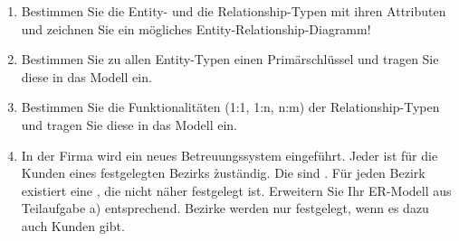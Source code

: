 \documentclass{lehramt-informatik-aufgabe}
\begin{document}
\begin{enumerate}


\item Bestimmen Sie die Entity- und die Relationship-Typen mit ihren
Attributen und zeichnen Sie ein mögliches Entity-Relationship-Diagramm!


\item Bestimmen Sie zu allen Entity-Typen einen Primärschlüssel und
tragen Sie diese in das Modell ein.


\item Bestimmen Sie die Funktionalitäten (1:1, 1:n, n:m) der
Relationship-Typen und tragen Sie diese in das Modell ein.


\item In der Firma wird ein neues Betreuungssystem eingeführt. Jeder
 ist für die Kunden eines festgelegten Bezirks
\r{zuständig}. Die  sind
. Für jeden Bezirk existiert eine
, die nicht näher festgelegt ist. Erweitern
Sie Ihr ER-Modell aus Teilaufgabe a) entsprechend. Bezirke werden nur
festgelegt, wenn es dazu auch Kunden gibt.

\end{enumerate}
\end{document}
